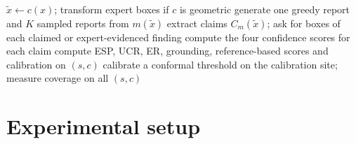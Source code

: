 \documentclass[pdflatex,sn-mathphys-num]{sn-jnl}
\theoremstyle{thmstyleone}
\begin{document}
\begin{algorithm}[t]
\caption{Evaluation protocol for one model $m$ (corruption runs; ablation runs replace $c$ by the evidence or control edit)}\label{alg:protocol}
\begin{algorithmic}[1]
    \State $\tilde x \gets c(x)$; transform expert boxes if $c$ is geometric
    \State generate one greedy report and $K$ sampled reports from $m(\tilde x)$
    \State extract claims $C_m(\tilde x)$; ask for boxes of each claimed or expert-evidenced finding
    \State compute the four confidence scores for each claim
  \EndFor
  \State compute ESP, UCR, ER, grounding, reference-based scores and calibration on $(s,c)$
\EndFor
\State calibrate a conformal threshold on the calibration site; measure coverage on all $(s,c)$
\end{algorithmic}
\end{algorithm}

\section{Experimental setup}\label{sec:setup}
\end{document}
